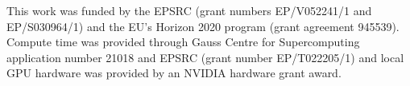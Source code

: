 \documentclass[sigconf]{acmart}
\begin{document}
\begin{acks}
This work was funded by the EPSRC (grant numbers EP/V052241/1 and EP/S030964/1) and the EU's Horizon 2020 program (grant agreement 945539).
Compute time was provided through Gauss Centre for Supercomputing application number 21018 and EPSRC (grant number EP/T022205/1) and local GPU hardware was provided by an NVIDIA hardware grant award.
\end{acks}

\balance


\end{document}
